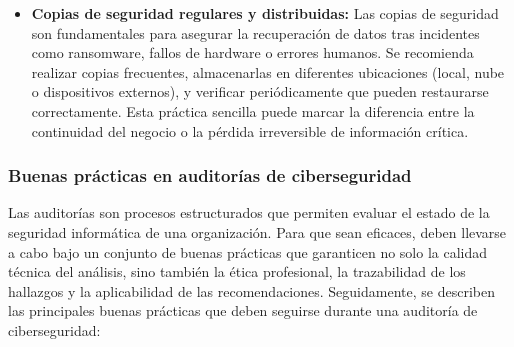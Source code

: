 \documentclass[a4paper, 11pt]{article}
\begin{document}
\begin{itemize}
    \item \textbf{Copias de seguridad regulares y distribuidas:}  
    Las copias de seguridad son fundamentales para asegurar la recuperación de datos tras incidentes como ransomware, fallos de hardware o errores humanos. Se recomienda realizar copias frecuentes, almacenarlas en diferentes ubicaciones (local, nube o dispositivos externos), y verificar periódicamente que pueden restaurarse correctamente. Esta práctica sencilla puede marcar la diferencia entre la continuidad del negocio o la pérdida irreversible de información crítica.

\end{itemize}
\par\vspace{0.5cm}

\subsubsection{Buenas prácticas en auditorías de ciberseguridad}
\par\vspace{0.5cm}

Las auditorías son procesos estructurados que permiten evaluar el estado de la seguridad informática de una organización. 
Para que sean eficaces, deben llevarse a cabo bajo un conjunto de buenas prácticas que garanticen no solo la calidad técnica del análisis, sino también la ética profesional, 
la trazabilidad de los hallazgos y la aplicabilidad de las recomendaciones. Seguidamente, se describen las principales buenas prácticas que deben seguirse durante una auditoría de ciberseguridad:
\end{document}
